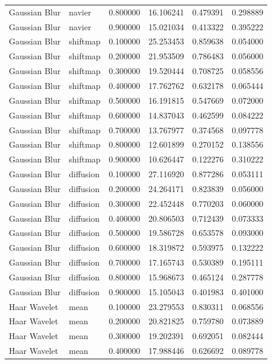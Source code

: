 \begin{table}[h]
\begin{tabular}{llrrrr}
Gaussian Blur & navier & 0.800000 & 16.106241 & 0.479391 & 0.298889 \\
Gaussian Blur & navier & 0.900000 & 15.021034 & 0.413322 & 0.395222 \\
Gaussian Blur & shiftmap & 0.100000 & 25.253453 & 0.859638 & 0.054000 \\
Gaussian Blur & shiftmap & 0.200000 & 21.953509 & 0.786483 & 0.056000 \\
Gaussian Blur & shiftmap & 0.300000 & 19.520444 & 0.708725 & 0.058556 \\
Gaussian Blur & shiftmap & 0.400000 & 17.762762 & 0.632178 & 0.065444 \\
Gaussian Blur & shiftmap & 0.500000 & 16.191815 & 0.547669 & 0.072000 \\
Gaussian Blur & shiftmap & 0.600000 & 14.837043 & 0.462599 & 0.084222 \\
Gaussian Blur & shiftmap & 0.700000 & 13.767977 & 0.374568 & 0.097778 \\
Gaussian Blur & shiftmap & 0.800000 & 12.601899 & 0.270152 & 0.138556 \\
Gaussian Blur & shiftmap & 0.900000 & 10.626447 & 0.122276 & 0.310222 \\
Gaussian Blur & diffusion & 0.100000 & 27.116920 & 0.877286 & 0.053111 \\
Gaussian Blur & diffusion & 0.200000 & 24.264171 & 0.823839 & 0.056000 \\
Gaussian Blur & diffusion & 0.300000 & 22.452448 & 0.770203 & 0.060000 \\
Gaussian Blur & diffusion & 0.400000 & 20.806503 & 0.712439 & 0.073333 \\
Gaussian Blur & diffusion & 0.500000 & 19.586728 & 0.653578 & 0.093000 \\
Gaussian Blur & diffusion & 0.600000 & 18.319872 & 0.593975 & 0.132222 \\
Gaussian Blur & diffusion & 0.700000 & 17.165743 & 0.530389 & 0.195111 \\
Gaussian Blur & diffusion & 0.800000 & 15.968673 & 0.465124 & 0.287778 \\
Gaussian Blur & diffusion & 0.900000 & 15.105043 & 0.401983 & 0.401000 \\
Haar Wavelet & mean & 0.100000 & 23.279553 & 0.830311 & 0.068556 \\
Haar Wavelet & mean & 0.200000 & 20.821825 & 0.759780 & 0.073889 \\
Haar Wavelet & mean & 0.300000 & 19.202391 & 0.692051 & 0.082444 \\
Haar Wavelet & mean & 0.400000 & 17.988446 & 0.626692 & 0.089778 \\

\end{tabular}
\end{table}
